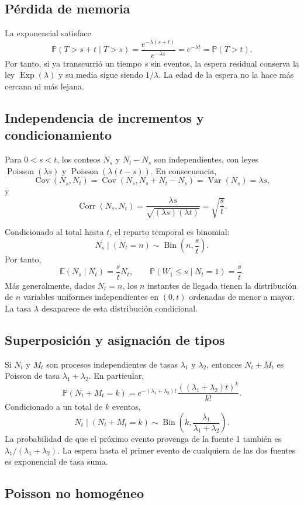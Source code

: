 \documentclass[11pt,oneside]{article}
\newcommand{\E}{\mathbb{E}}
\newcommand{\Prob}{\mathbb{P}}
\newcommand{\Var}{\operatorname{Var}}
\newcommand{\Cov}{\operatorname{Cov}}
\newcommand{\Corr}{\operatorname{Corr}}
\newcommand{\Pois}{\operatorname{Poisson}}
\newcommand{\Exp}{\operatorname{Exp}}
\newcommand{\Bin}{\operatorname{Bin}}
\newcommand{\1}{\mathbf{1}}
\begin{document}
\subsection{Pérdida de memoria}

La exponencial satisface
\[
\Prob(T>s+t\mid T>s)=\frac{e^{-\lambda(s+t)}}{e^{-\lambda s}}=e^{-\lambda t}=\Prob(T>t).
\]
Por tanto, si ya transcurrió un tiempo $s$ sin eventos, la espera residual conserva la ley $\Exp(\lambda)$ y su media sigue siendo $1/\lambda$. La edad de la espera no la hace más cercana ni más lejana.

\subsection{Independencia de incrementos y condicionamiento}

Para $0<s<t$, los conteos $N_s$ y $N_t-N_s$ son independientes, con leyes $\Pois(\lambda s)$ y $\Pois(\lambda(t-s))$. En consecuencia,
\[
\Cov(N_s,N_t)=\Cov(N_s,N_s+N_t-N_s)=\Var(N_s)=\lambda s,
\]
y
\[
\Corr(N_s,N_t)=\frac{\lambda s}{\sqrt{(\lambda s)(\lambda t)}}=\sqrt{\frac{s}{t}}.
\]

Condicionado al total hasta $t$, el reparto temporal es binomial:
\[
\boxed{N_s\mid(N_t=n)\sim\Bin\left(n,\frac{s}{t}\right).}
\]
Por tanto,
\[
\E(N_s\mid N_t)=\frac{s}{t}N_t,
\qquad \Prob(W_1\leq s\mid N_t=1)=\frac{s}{t}.
\]
Más generalmente, dados $N_t=n$, los $n$ instantes de llegada tienen la distribución de $n$ variables uniformes independientes en $(0,t)$ ordenadas de menor a mayor. La tasa $\lambda$ desaparece de esta distribución condicional.

\subsection{Superposición y asignación de tipos}

Si $N_t$ y $M_t$ son procesos independientes de tasas $\lambda_1$ y $\lambda_2$, entonces $N_t+M_t$ es Poisson de tasa $\lambda_1+\lambda_2$. En particular,
\[
\Prob(N_t+M_t=k)=e^{-(\lambda_1+\lambda_2)t}
\frac{((\lambda_1+\lambda_2)t)^k}{k!}.
\]
Condicionado a un total de $k$ eventos,
\[
N_t\mid(N_t+M_t=k)\sim
\Bin\left(k,\frac{\lambda_1}{\lambda_1+\lambda_2}\right).
\]
La probabilidad de que el próximo evento provenga de la fuente 1 también es $\lambda_1/(\lambda_1+\lambda_2)$. La espera hasta el primer evento de cualquiera de las dos fuentes es exponencial de tasa suma.

\subsection{Poisson no homogéneo}
\end{document}
